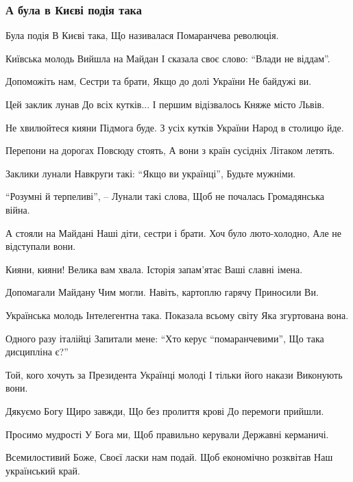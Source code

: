  
 
 

\subsubsection{А була в Києві подія така}
\label{sec:poetry.rus.anastasia_lagan_1954.kiev_podija_taka}

Була подія
В Києві така,
Що називалася
Помаранчева революція.

Київська молодь
Вийшла на Майдан
І сказала своє слово:
“Влади не віддам”.

Допоможіть нам,
Сестри та брати,
Якщо до долі України
Не байдужі ви.

Цей заклик лунав
До всіх кутків...
І першим відізвалось
Княже місто Львів.

Не хвилюйтеся кияни
Підмога буде.
З усіх кутків України
Народ в столицю йде.

Перепони на дорогах
Повсюду стоять,
А вони з країн сусідніх
Літаком летять.

Заклики лунали
Навкруги такі:
“Якщо ви українці”,
Будьте мужніми.

“Розумні й терпеливі”, –
Лунали такі слова,
Щоб не почалась
Громадянська війна.

А стояли на Майдані
Наші діти, сестри і брати.
Хоч було люто-холодно,
Але не відступали вони.

Кияни, кияни!
Велика вам хвала.
Історія запам’ятає
Ваші славні імена.

Допомагали Майдану
Чим могли.
Навіть, картоплю гарячу
Приносили Ви.

Українська молодь
Інтелегентна така.
Показала всьому світу
Яка згуртована вона.

Одного разу італійці
Запитали мене:
“Хто керує “помаранчевими”,
Що така дисципліна є?”

Той, кого хочуть за Президента
Українці молоді
І тільки його накази
Виконують вони.

Дякуємо Богу
Щиро завжди,
Що без пролиття крові
До перемоги прийшли.

Просимо мудрості
У Бога ми,
Щоб правильно керували
Державні керманичі.

Всемилостивий Боже,
Своєї ласки нам подай.
Щоб економічно розквітав
Наш український край. 
